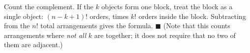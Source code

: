 Count the complement. If the $k$ objects form one block, treat the block as a single object: $(n-k+1)!$ orders, times $k!$ orders inside the block. Subtracting from the $n!$ total arrangements gives the formula. $\blacksquare$ (Note that this counts arrangements where \emph{not all} $k$ are together; it does not require that no two of them are adjacent.)
